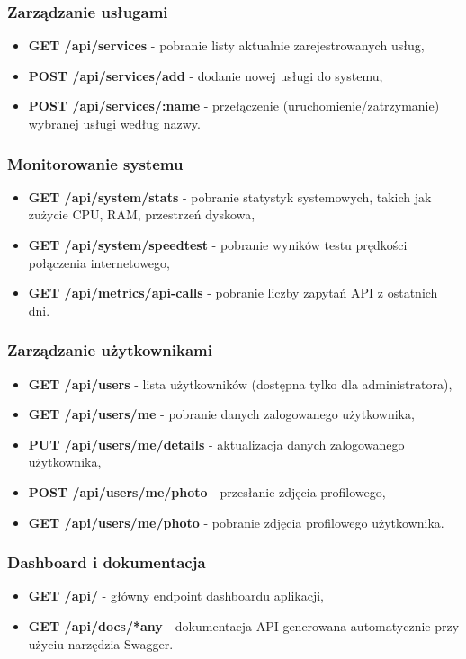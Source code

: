 \subsubsection{Zarządzanie usługami}
\begin{itemize}
    \item \textbf{GET /api/services} - pobranie listy aktualnie zarejestrowanych usług,
    \item \textbf{POST /api/services/add} - dodanie nowej usługi do systemu,
    \item \textbf{POST /api/services/:name} - przełączenie (uruchomienie/zatrzymanie) wybranej usługi według nazwy.
\end{itemize}

\subsubsection{Monitorowanie systemu}
\begin{itemize}
    \item \textbf{GET /api/system/stats} - pobranie statystyk systemowych, takich jak zużycie CPU, RAM, przestrzeń dyskowa,
    \item \textbf{GET /api/system/speedtest} - pobranie wyników testu prędkości połączenia internetowego,
    \item \textbf{GET /api/metrics/api-calls} - pobranie liczby zapytań API z ostatnich dni.
\end{itemize}

\subsubsection{Zarządzanie użytkownikami}
\begin{itemize}
    \item \textbf{GET /api/users} - lista użytkowników (dostępna tylko dla administratora),
    \item \textbf{GET /api/users/me} - pobranie danych zalogowanego użytkownika,
    \item \textbf{PUT /api/users/me/details} - aktualizacja danych zalogowanego użytkownika,
    \item \textbf{POST /api/users/me/photo} - przesłanie zdjęcia profilowego,
    \item \textbf{GET /api/users/me/photo} - pobranie zdjęcia profilowego użytkownika.
\end{itemize}

\subsubsection{Dashboard i dokumentacja}
\begin{itemize}
    \item \textbf{GET /api/} - główny endpoint dashboardu aplikacji,
    \item \textbf{GET /api/docs/*any} - dokumentacja API generowana automatycznie przy użyciu narzędzia Swagger.
\end{itemize}

